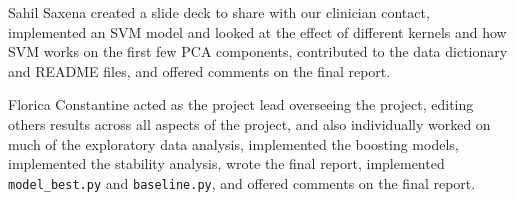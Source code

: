 \documentclass[11pt, letterpaper]{amsart}
\begin{document}
Sahil Saxena created a slide deck to share with our clinician contact, implemented an SVM model and looked at the effect of different kernels and how SVM works on the first few PCA components, contributed to the data dictionary and README files, and offered comments on the final report.

Florica Constantine acted as the project lead overseeing the project, editing others results across all aspects of the project, and also individually worked on much of the exploratory data analysis, implemented the boosting models, implemented the stability analysis, wrote the final report, implemented \texttt{model\_best.py} and \texttt{baseline.py}, and offered comments on the final report.

\printbibliography
\end{document}
